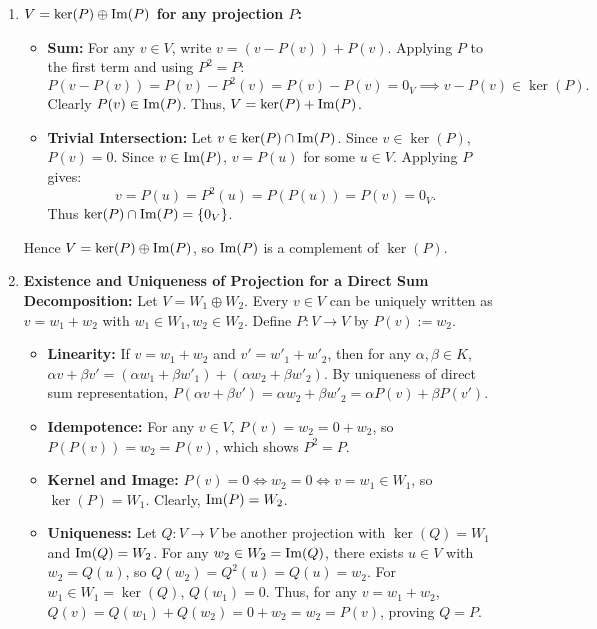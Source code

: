 \begin{exercisesolution}
\label{sol:projections_and_complements}
\begin{enumerate}[label=\textbf{(\alph*)}]
    \item \textbf{$V = \ker(P) \oplus \operatorname{Im}(P)$ for any projection $P$:}
    \begin{itemize}
        \item \textbf{Sum:} For any $v \in V$, write $v = (v - P(v)) + P(v)$.
        Applying $P$ to the first term and using $P^2 = P$:
        \[
        P(v - P(v)) = P(v) - P^2(v) = P(v) - P(v) = 0_V \implies v - P(v) \in \ker(P).
        \]
        Clearly $P(v) \in \operatorname{Im}(P)$. Thus, $V = \ker(P) + \operatorname{Im}(P)$.
        \item \textbf{Trivial Intersection:} Let $v \in \ker(P) \cap \operatorname{Im}(P)$. Since $v \in \ker(P)$, $P(v) = 0$. Since $v \in \operatorname{Im}(P)$, $v = P(u)$ for some $u \in V$. Applying $P$ gives:
        \[
        v = P(u) = P^2(u) = P(P(u)) = P(v) = 0_V.
        \]
        Thus $\ker(P) \cap \operatorname{Im}(P) = \{0_V\}$.
    \end{itemize}
    Hence $V = \ker(P) \oplus \operatorname{Im}(P)$, so $\operatorname{Im}(P)$ is a complement of $\ker(P)$.

    \item \textbf{Existence and Uniqueness of Projection for a Direct Sum Decomposition:}
    Let $V = W_1 \oplus W_2$. Every $v \in V$ can be uniquely written as $v = w_1 + w_2$ with $w_1 \in W_1, w_2 \in W_2$.
    Define $P \colon V \to V$ by $P(v) := w_2$.
    \begin{itemize}
        \item \textbf{Linearity:} If $v = w_1 + w_2$ and $v' = w'_1 + w'_2$, then for any $\alpha, \beta \in K$, $\alpha v + \beta v' = (\alpha w_1 + \beta w'_1) + (\alpha w_2 + \beta w'_2)$. By uniqueness of direct sum representation, $P(\alpha v + \beta v') = \alpha w_2 + \beta w'_2 = \alpha P(v) + \beta P(v')$.
        \item \textbf{Idempotence:} For any $v \in V$, $P(v) = w_2 = 0 + w_2$, so $P(P(v)) = w_2 = P(v)$, which shows $P^2 = P$.
        \item \textbf{Kernel and Image:} $P(v) = 0 \iff w_2 = 0 \iff v = w_1 \in W_1$, so $\ker(P) = W_1$. Clearly, $\operatorname{Im}(P) = W_2$.
        \item \textbf{Uniqueness:} Let $Q \colon V \to V$ be another projection with $\ker(Q) = W_1$ and $\operatorname{Im}(Q) = W_2$. For any $w_2 \in W_2 = \operatorname{Im}(Q)$, there exists $u \in V$ with $w_2 = Q(u)$, so $Q(w_2) = Q^2(u) = Q(u) = w_2$. For $w_1 \in W_1 = \ker(Q)$, $Q(w_1) = 0$. Thus, for any $v = w_1 + w_2$, $Q(v) = Q(w_1) + Q(w_2) = 0 + w_2 = w_2 = P(v)$, proving $Q = P$.
    \end{itemize}
\end{enumerate}
\end{exercisesolution}


